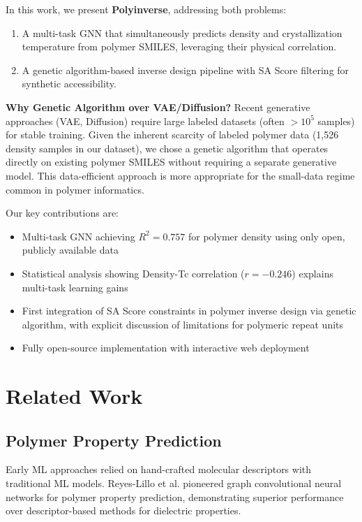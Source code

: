 \documentclass{article}
\begin{document}
In this work, we present \textbf{Polyinverse}, addressing both problems:
\begin{enumerate}
    \item A multi-task GNN that simultaneously predicts density and crystallization
    temperature from polymer SMILES, leveraging their physical correlation.
    \item A genetic algorithm-based inverse design pipeline with SA Score
    \citep{ertl_sa_score_2009} filtering for synthetic accessibility.
\end{enumerate}

\noindent\textbf{Why Genetic Algorithm over VAE/Diffusion?}
Recent generative approaches (VAE, Diffusion) require large labeled datasets
(often $>10^5$ samples) for stable training. Given the inherent scarcity of
labeled polymer data (1,526 density samples in our dataset), we chose a
genetic algorithm that operates directly on existing polymer SMILES without
requiring a separate generative model. This data-efficient approach is more
appropriate for the small-data regime common in polymer informatics.

\noindent Our key contributions are:
\begin{itemize}
    \item Multi-task GNN achieving $R^2=0.757$ for polymer density using
    only open, publicly available data
    \item Statistical analysis showing Density-Tc correlation ($r=-0.246$)
    explains multi-task learning gains
    \item First integration of SA Score constraints in polymer inverse design
    via genetic algorithm, with explicit discussion of limitations for
    polymeric repeat units
    \item Fully open-source implementation with interactive web deployment
\end{itemize}

\section{Related Work}

\subsection{Polymer Property Prediction}

Early ML approaches relied on hand-crafted molecular descriptors with traditional
ML models. Reyes-Lillo et al. \citep{gcnn_polymer_2018} pioneered graph convolutional neural networks
for polymer property prediction, demonstrating superior performance over
descriptor-based methods for dielectric properties.
\end{document}
